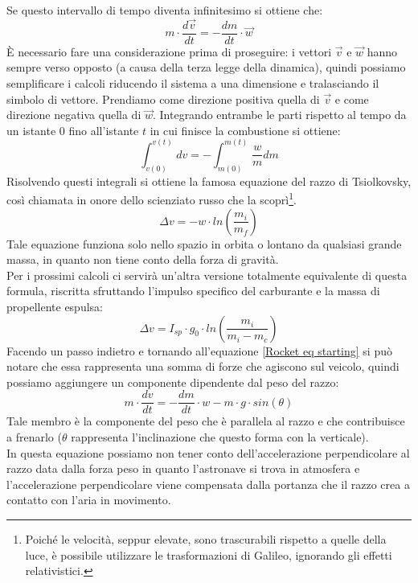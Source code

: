 Se questo intervallo di tempo diventa infinitesimo si ottiene che:
\begin{equation}
    \label{Rocket eq starting}
    m \cdot \frac{d\Vec{v}}{dt} = - \frac{dm}{dt} \cdot \Vec{w}
\end{equation}
È necessario fare una considerazione prima di proseguire: i vettori $\Vec{v}$ e $\Vec{w}$ hanno sempre verso opposto (a causa della terza legge della dinamica), quindi possiamo semplificare i calcoli riducendo il sistema a una dimensione e tralasciando il simbolo di vettore. Prendiamo come direzione positiva quella di $\Vec{v}$ e come direzione negativa quella di $\Vec{w}$.
Integrando entrambe le parti rispetto al tempo da un istante $0$ fino all'istante $t$ in cui finisce la combustione si ottiene:
$$
\int_{v(0)}^{v(t)}dv = -\int_{m(0)}^{m(t)}\frac{w}{m}dm
$$
Risolvendo questi integrali si ottiene la famosa equazione del razzo di Tsiolkovsky, così chiamata in onore dello scienziato russo che la scoprì\footnote{Poiché le velocità, seppur elevate, sono trascurabili rispetto a quelle della luce, è possibile utilizzare le trasformazioni di Galileo, ignorando gli effetti relativistici.}.
\begin{equation}
    \label{Rocket eq}
    \Delta v = -w \cdot ln\left(\frac{m_i}{m_f}\right)
\end{equation}
Tale equazione funziona solo nello spazio in orbita o lontano da qualsiasi grande massa, in quanto non tiene conto della forza di gravità.\\
Per i prossimi calcoli ci servirà un'altra versione totalmente equivalente di questa formula, riscritta sfruttando l'impulso specifico del carburante e la massa di propellente espulsa:
\begin{equation}
    \label{rocket eq bella}
    \Delta v = I_{sp} \cdot g_0\cdot ln\left(\frac{m_i}{m_i- m_c}\right)
\end{equation}
Facendo un passo indietro e tornando all'equazione \ref{Rocket eq starting} si può notare che essa rappresenta una somma di forze che agiscono sul veicolo, quindi possiamo aggiungere un componente dipendente dal peso del razzo:
\begin{equation}
    \label{Rocket eq starting grav}
    m \cdot \frac{dv}{dt} = - \frac{dm}{dt} \cdot w - m \cdot g \cdot sin (\theta)
\end{equation}
Tale membro è la componente del peso che è parallela al razzo e che contribuisce a frenarlo ($\theta$ rappresenta l'inclinazione che questo forma con la verticale).\\ In questa equazione possiamo non tener conto dell'accelerazione perpendicolare al razzo data dalla forza peso in quanto l'astronave si trova in atmosfera e l'accelerazione perpendicolare viene compensata dalla portanza che il razzo crea a contatto con l'aria in movimento.\\
